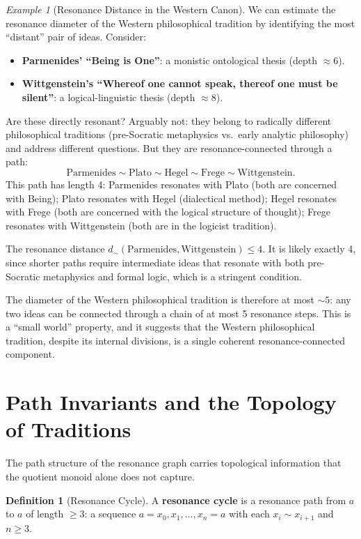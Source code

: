 \documentclass[11pt,openany]{book}
\theoremstyle{definition}
\newtheorem{definition}[axiom]{Definition}
\theoremstyle{plain}
\theoremstyle{remark}
\newtheorem{example}[axiom]{Example}
\newcommand{\res}{\sim}                      %
\begin{document}
\begin{example}[Resonance Distance in the Western Canon]
We can estimate the resonance diameter of the Western philosophical tradition by identifying the most ``distant'' pair of ideas. Consider:
\begin{itemize}
\item \textbf{Parmenides' ``Being is One''}: a monistic ontological thesis (depth $\approx 6$).
\item \textbf{Wittgenstein's ``Whereof one cannot speak, thereof one must be silent''}: a logical-linguistic thesis (depth $\approx 8$).
\end{itemize}
Are these directly resonant? Arguably not: they belong to radically different philosophical traditions (pre-Socratic metaphysics vs.\ early analytic philosophy) and address different questions. But they are resonance-connected through a path:
\[
\text{Parmenides} \res \text{Plato} \res \text{Hegel} \res \text{Frege} \res \text{Wittgenstein}.
\]
This path has length 4: Parmenides resonates with Plato (both are concerned with Being); Plato resonates with Hegel (dialectical method); Hegel resonates with Frege (both are concerned with the logical structure of thought); Frege resonates with Wittgenstein (both are in the logicist tradition).

The resonance distance $d_\res(\text{Parmenides}, \text{Wittgenstein}) \leq 4$. It is likely exactly 4, since shorter paths require intermediate ideas that resonate with both pre-Socratic metaphysics and formal logic, which is a stringent condition.

The diameter of the Western philosophical tradition is therefore at most $\sim 5$: any two ideas can be connected through a chain of at most 5 resonance steps. This is a ``small world'' property, and it suggests that the Western philosophical tradition, despite its internal divisions, is a single coherent resonance-connected component.
\end{example}

\section{Path Invariants and the Topology of Traditions}

The path structure of the resonance graph carries topological information that the quotient monoid alone does not capture.

\begin{definition}[Resonance Cycle]
A \textbf{resonance cycle} is a resonance path from $a$ to $a$ of length $\geq 3$: a sequence $a = x_0, x_1, \ldots, x_n = a$ with each $x_i \res x_{i+1}$ and $n \geq 3$.
\end{definition}
\end{document}
